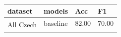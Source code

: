 





\begin{table}[!h]
\centering
\begin{tabular}{|l|l||ll|}
\hline
dataset                    & models      & Acc   & F1    \\ \hline \hline
\multirow{3}{*}{All Czech} & baseline    & 82.00 & 70.00 \\ \cline{2-4} 
                           
                           
                           

\end{tabular}
\end{table}
